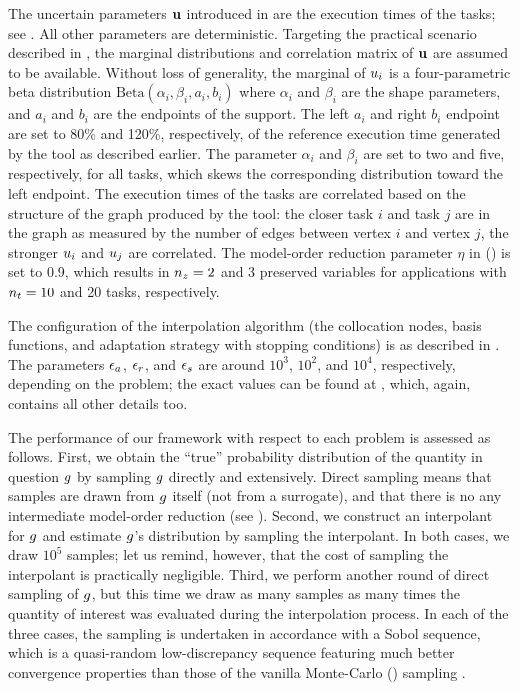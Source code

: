 The uncertain parameters $\mathbf{u}$ introduced in  are the execution
times of the tasks; see . All other parameters are deterministic.
Targeting the practical scenario described in , the marginal
distributions and correlation matrix of $\mathbf{u}$ are assumed to be available.
Without loss of generality, the marginal of $u_i$ is a four-parametric beta
distribution $\text{Beta}(\alpha_i, \beta_i, a_i, b_i)$ where $\alpha_i$ and
$\beta_i$ are the shape parameters, and $a_i$ and $b_i$ are the endpoints of the
support. The left $a_i$ and right $b_i$ endpoint are set to 80\% and 120\%,
respectively, of the reference execution time generated by the  tool as
described earlier. The parameter $\alpha_i$ and $\beta_i$ are set to two and
five, respectively, for all tasks, which skews the corresponding distribution
toward the left endpoint. The execution times of the tasks are correlated based
on the structure of the graph produced by the  tool: the closer task
$i$ and task $j$ are in the graph as measured by the number of edges between
vertex $i$ and vertex $j$, the stronger $u_i$ and $u_j$ are correlated. The
model-order reduction parameter $\eta$ in  ()
is set to 0.9, which results in ${n_z} = 2$ and 3 preserved variables for
applications with ${n_t} = 10$ and 20 tasks, respectively.

The configuration of the interpolation algorithm (the collocation nodes, basis
functions, and adaptation strategy with stopping conditions) is as described in
. The parameters $\epsilon_a$, $\epsilon_r$, and $\epsilon_s$ are
around $10^3$, $10^2$, and $10^4$, respectively, depending on the problem; the
exact values can be found at \cite{sources}, which, again, contains all other
details too.

The performance of our framework with respect to each problem is assessed as
follows. First, we obtain the ``true'' probability distribution of the quantity
in question $g$ by sampling $g$ directly and extensively. Direct sampling
means that samples are drawn from $g$ itself (not from a surrogate), and that
there is no any intermediate model-order reduction (see ).
Second, we construct an interpolant for $g$ and estimate $g$'s distribution by
sampling the interpolant. In both cases, we draw $10^5$ samples; let us remind,
however, that the cost of sampling the interpolant is practically negligible.
Third, we perform another round of direct sampling of $g$, but this time we
draw as many samples as many times the quantity of interest was evaluated during
the interpolation process. In each of the three cases, the sampling is
undertaken in accordance with a Sobol sequence, which is a quasi-random
low-discrepancy sequence featuring much better convergence properties than those
of the vanilla Monte-Carlo () sampling \cite{joe2008}.

